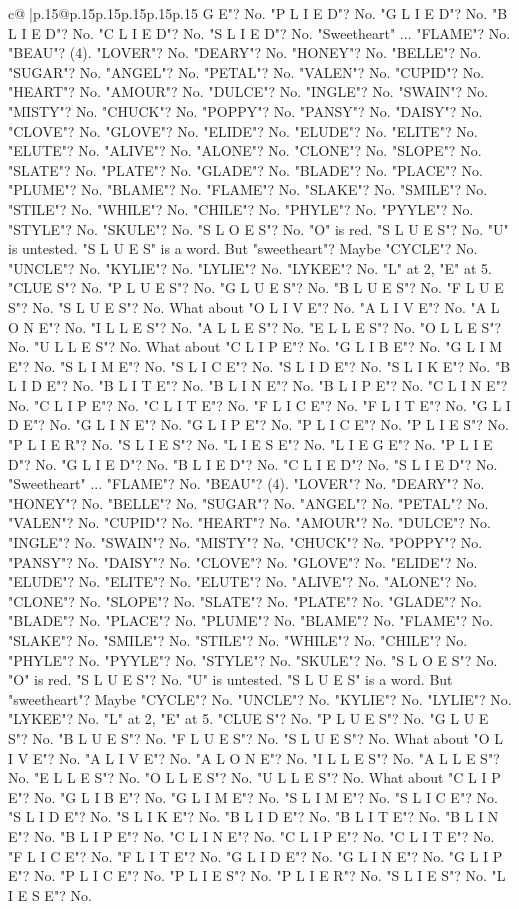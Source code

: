 \documentclass{article}
\begin{document}
{\begin{supertabular}{c@{$\;$}|p{.15\linewidth}@{}p{.15\linewidth}p{.15\linewidth}p{.15\linewidth}p{.15\linewidth}p{.15\linewidth}}
{{{G E"? No. "P L I E D"? No. "G L I E D"? No. "B L I E D"? No. "C L I E D"? No. "S L I E D"? No. "Sweetheart" ... "FLAME"? No. "BEAU"? (4). "LOVER"? No. "DEARY"? No. "HONEY"? No. "BELLE"? No. "SUGAR"? No. "ANGEL"? No. "PETAL"? No. "VALEN"? No. "CUPID"? No. "HEART"? No. "AMOUR"? No. "DULCE"? No. "INGLE"? No. "SWAIN"? No. "MISTY"? No. "CHUCK"? No. "POPPY"? No. "PANSY"? No. "DAISY"? No. "CLOVE"? No. "GLOVE"? No. "ELIDE"? No. "ELUDE"? No. "ELITE"? No. "ELUTE"? No. "ALIVE"? No. "ALONE"? No. "CLONE"? No. "SLOPE"? No. "SLATE"? No. "PLATE"? No. "GLADE"? No. "BLADE"? No. "PLACE"? No. "PLUME"? No. "BLAME"? No. "FLAME"? No. "SLAKE"? No. "SMILE"? No. "STILE"? No. "WHILE"? No. "CHILE"? No. "PHYLE"? No. "PYYLE"? No. "STYLE"? No. "SKULE"? No. "S L O E S"? No. "O" is red. "S L U E S"? No. "U" is untested. "S L U E S" is a word. But "sweetheart"? Maybe "CYCLE"? No. "UNCLE"? No. "KYLIE"? No. "LYLIE"? No. "LYKEE"? No. "L" at 2, "E" at 5. "CLUE S"? No. "P L U E S"? No. "G L U E S"? No. "B L U E S"? No. "F L U E S"? No. "S L U E S"? No. What about "O L I V E"? No. "A L I V E"? No. "A L O N E"? No. "I L L E S"? No. "A L L E S"? No. "E L L E S"? No. "O L L E S"? No. "U L L E S"? No. What about "C L I P E"? No. "G L I B E"? No. "G L I M E"? No. "S L I M E"? No. "S L I C E"? No. "S L I D E"? No. "S L I K E"? No. "B L I D E"? No. "B L I T E"? No. "B L I N E"? No. "B L I P E"? No. "C L I N E"? No. "C L I P E"? No. "C L I T E"? No. "F L I C E"? No. "F L I T E"? No. "G L I D E"? No. "G L I N E"? No. "G L I P E"? No. "P L I C E"? No. "P L I E S"? No. "P L I E R"? No. "S L I E S"? No. "L I E S E"? No. "L I E G E"? No. "P L I E D"? No. "G L I E D"? No. "B L I E D"? No. "C L I E D"? No. "S L I E D"? No. "Sweetheart" ... "FLAME"? No. "BEAU"? (4). "LOVER"? No. "DEARY"? No. "HONEY"? No. "BELLE"? No. "SUGAR"? No. "ANGEL"? No. "PETAL"? No. "VALEN"? No. "CUPID"? No. "HEART"? No. "AMOUR"? No. "DULCE"? No. "INGLE"? No. "SWAIN"? No. "MISTY"? No. "CHUCK"? No. "POPPY"? No. "PANSY"? No. "DAISY"? No. "CLOVE"? No. "GLOVE"? No. "ELIDE"? No. "ELUDE"? No. "ELITE"? No. "ELUTE"? No. "ALIVE"? No. "ALONE"? No. "CLONE"? No. "SLOPE"? No. "SLATE"? No. "PLATE"? No. "GLADE"? No. "BLADE"? No. "PLACE"? No. "PLUME"? No. "BLAME"? No. "FLAME"? No. "SLAKE"? No. "SMILE"? No. "STILE"? No. "WHILE"? No. "CHILE"? No. "PHYLE"? No. "PYYLE"? No. "STYLE"? No. "SKULE"? No. "S L O E S"? No. "O" is red. "S L U E S"? No. "U" is untested. "S L U E S" is a word. But "sweetheart"? Maybe "CYCLE"? No. "UNCLE"? No. "KYLIE"? No. "LYLIE"? No. "LYKEE"? No. "L" at 2, "E" at 5. "CLUE S"? No. "P L U E S"? No. "G L U E S"? No. "B L U E S"? No. "F L U E S"? No. "S L U E S"? No. What about "O L I V E"? No. "A L I V E"? No. "A L O N E"? No. "I L L E S"? No. "A L L E S"? No. "E L L E S"? No. "O L L E S"? No. "U L L E S"? No. What about "C L I P E"? No. "G L I B E"? No. "G L I M E"? No. "S L I M E"? No. "S L I C E"? No. "S L I D E"? No. "S L I K E"? No. "B L I D E"? No. "B L I T E"? No. "B L I N E"? No. "B L I P E"? No. "C L I N E"? No. "C L I P E"? No. "C L I T E"? No. "F L I C E"? No. "F L I T E"? No. "G L I D E"? No. "G L I N E"? No. "G L I P E"? No. "P L I C E"? No. "P L I E S"? No. "P L I E R"? No. "S L I E S"? No. "L I E S E"? No. }}}
\end{supertabular}}
\end{document}
